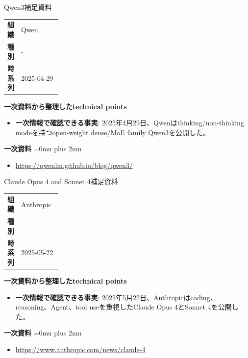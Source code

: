 \begin{technicalnote}{Qwen3}{補足資料}
\begingroup
\begin{tabularx}{\linewidth}{@{}>{\bfseries}p{0.22\linewidth}X@{}}
組織 & Qwen \\
種別 & - \\
時系列 & 2025-04-29 \\
\end{tabularx}
\smallskip
{\bfseries 一次資料から整理したtechnical points}
\begin{itemize}[leftmargin=1.5em,itemsep=0.35em]
\item \textbf{一次情報で確認できる事実}: 2025年4月29日、Qwenはthinking/non-thinking modeを持つopen-weight dense/MoE family Qwen3を公開した。
\end{itemize}
\begin{samepage}
{\bfseries 一次資料}
\begingroup\sloppy
\Urlmuskip=0mu plus 2mu\relax
\begin{itemize}[leftmargin=1.5em,itemsep=0.25em]
\item {\scriptsize\url{https://qwenlm.github.io/blog/qwen3/}}
\end{itemize}
\endgroup
\end{samepage}
\endgroup
\end{technicalnote}
\medskip

\begin{technicalnote}{Claude Opus 4 and Sonnet 4}{補足資料}
\begingroup
\begin{tabularx}{\linewidth}{@{}>{\bfseries}p{0.22\linewidth}X@{}}
組織 & Anthropic \\
種別 & - \\
時系列 & 2025-05-22 \\
\end{tabularx}
\smallskip
{\bfseries 一次資料から整理したtechnical points}
\begin{itemize}[leftmargin=1.5em,itemsep=0.35em]
\item \textbf{一次情報で確認できる事実}: 2025年5月22日、Anthropicはcoding、reasoning、Agent、tool useを重視したClaude Opus 4とSonnet 4を公開した。
\end{itemize}
\begin{samepage}
{\bfseries 一次資料}
\begingroup\sloppy
\Urlmuskip=0mu plus 2mu\relax
\begin{itemize}[leftmargin=1.5em,itemsep=0.25em]
\item {\scriptsize\url{https://www.anthropic.com/news/claude-4}}
\end{itemize}
\endgroup
\end{samepage}
\endgroup
\end{technicalnote}
\medskip


